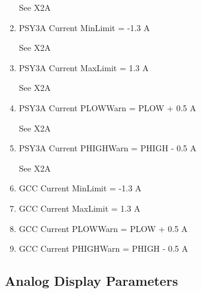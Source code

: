 \documentclass[11pt]{book}		%
\begin{document}
\begin{enumerate}
\color{red}
See X2A
\color{black}

 \item PSY3A Current MinLimit = -1.3 A

\color{red}
See X2A
\color{black}

 \item PSY3A Current MaxLimit = 1.3 A

\color{red}
See X2A
\color{black}

 \item PSY3A Current PLOWWarn = PLOW + 0.5 A

\color{red}
See X2A
\color{black}

 \item PSY3A Current PHIGHWarn = PHIGH - 0.5 A

\color{red}
See X2A
\color{black}

 \item GCC Current MinLimit = -1.3 A
 \item GCC Current MaxLimit = 1.3 A
 \item GCC Current PLOWWarn = PLOW + 0.5 A
 \item GCC Current PHIGHWarn = PHIGH - 0.5 A
\end{enumerate}

\subsection{Analog Display Parameters} \label{sect:cyc-op-interface-status-beamline-fc1totarget-analog-display}
\end{document}
